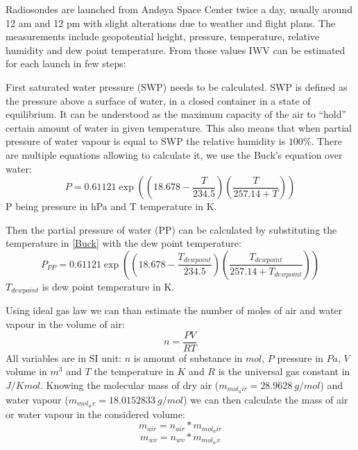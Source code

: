 \documentclass[]{book}
\begin{document}
	Radiosondes are launched from And\o{}ya Space Center twice a day, usually around 12 am and 12 pm with slight alterations due to weather and flight plans. The measurements include geopotential height, pressure, temperature, relative humidity and dew point temperature. From those values IWV can be estimated for each launch in few steps:
	
	First saturated water pressure (SWP) needs to be calculated. SWP is defined as the pressure above a surface of water, in a closed container in a state of equilibrium. It can be understood as the maximum capacity of the air to “hold” certain amount of water in given temperature. This also means that when partial pressure of water vapour is equal to SWP the relative humidity is $100 \%$. There are multiple equations allowing to calculate it, we use the Buck’s equation over water:
	\begin{equation}\label{Buck}
	P = 0.61121 \exp((18.678 - \frac{T}{234.5})(\frac{T}{257.14 + T}))
	\end{equation}
	P being pressure in hPa and T temperature in K.
	
	Then the partial pressure of water (PP) can be calculated by substituting the temperature in \ref{Buck} with the dew point temperature:
	\begin{equation}\label{PP}
	P_{PP} = 0.61121 \exp((18.678 - \frac{T_{dew point}}{234.5})(\frac{T_{dew point}}{257.14 + T_{dew point}}))
	\end{equation}
	$T_{dew point}$ is dew point temperature in K.
	
	Using ideal gas law we can than estimate the number of moles of air and water vapour in the volume of air:
	\begin{equation}\label{ideal_gas}
	n = \frac{PV}{RT}
	\end{equation}
	All variables are in SI unit: $n$ is amount of substance in $mol$, $P$ pressure in $Pa$, $V$ volume in $m^3$ and $T$ the temperature in $K$ and $R$ is the universal gas constant in $J/Kmol$.
	Knowing the molecular mass of dry air ($m_{mol_air} = 28.9628 \  g/mol$) and water vapour ($m_{mol_wv} = 18.0152833 \  g/mol$) we can then calculate the mass of air or water vapour in the considered volume:
	\begin{equation}\label{mass_air}
	m_{air} = n_{air} * m_{mol_air}
	\end{equation}
	\begin{equation}\label{mass_wv}
	m_{wv} = n_{wv} * m_{mol_wv}
	\end{equation}
	
\end{document}
